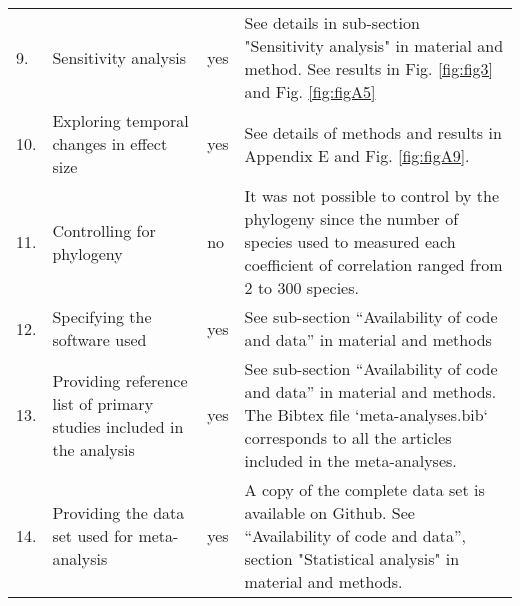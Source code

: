 \documentclass[a4paper,11pt]{article}
\begin{document}
\begin{table}[h!]
{\begin{tabular}{p{0.2cm}p{4cm}p{0.8cm}p{7cm}}
  9.& Sensitivity analysis &	yes &	See details in sub-section "Sensitivity analysis" in material and method. See results in Fig. \ref{fig:fig3} and Fig. \ref{fig:figA5}  \\
  10.& Exploring temporal changes in effect size &	yes	& See details of methods and results in Appendix E and Fig. \ref{fig:figA9}. \\
  11.& Controlling for phylogeny &	no &	It was not possible to control by the phylogeny since the number of species used to measured each coefficient of correlation ranged from 2 to 300 species.\\
  12.& Specifying the software used &	yes	& See sub-section ``Availability of code and data'' in material and methods\\
 13.& Providing reference list of primary studies included in the analysis &	yes &	See sub-section ``Availability of code and data'' in material and methods. The Bibtex file `meta-analyses.bib` corresponds to all the articles included in the meta-analyses. \\
  14.& Providing the data set used for meta-analysis  &	yes &	A copy of the complete data set is available on Github. See ``Availability of code and data'', section "Statistical analysis" in material and methods. \\
   \hline
\end{tabular}
}
\label{tab:meta}
\end{table}
\end{document}
